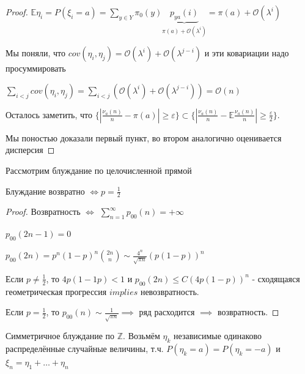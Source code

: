 \begin{proof}
    $\mathbb{E} \eta_i = P(\xi_i = a) = \sum\limits_{y \in Y} \pi_0 (y) \underbrace{p_{ya} (i)}_{\pi (a) + \mathcal{O} (\lambda^i)} = \pi (a) + \mathcal{O} (\lambda^i)$ 

    Мы поняли, что $cov (\eta_i, \eta_j) = \mathcal{O} (\lambda^i) + \mathcal{O} (\lambda^{j - i})$ и эти ковариации надо просуммировать

    $\sum\limits_{i < j} cov (\eta_i, \eta_j) = \sum\limits_{i < j} \left(\mathcal{O} (\lambda^i) + \mathcal{O} (\lambda^{j - i})\right) = \mathcal{O} (n)$

    Осталось заметить, что $\{ \left| \frac{\nu_a (n)}{n} - \pi (a) \right| \geqslant \varepsilon \} \subset \{ \left| \frac{\nu_a (n)}{n} - \mathbb{E} \frac{\nu_a (n)}{n} \right| \geqslant \frac{\varepsilon}{2} \}$.

    Мы поностью доказали первый пункт, во втором аналогично оценивается дисперсия
\end{proof}


\begin{theorem}
    Рассмотрим блуждание по целочисленной прямой

    Блуждание возвратно $\Longleftrightarrow p = \frac{1}{2}$
\end{theorem}

\begin{proof}
    Возвратность $\Longleftrightarrow$ $\sum\limits_{n=1}^\infty p_{00} (n) = +\infty$

    $p_{00} (2n - 1) = 0$

    $p_{00} (2n) = p^n (1-p)^n \binom{2n}{n} \sim \frac{4^n}{\sqrt{\pi n}} (p(1-p))^n $

    Если $p \neq \frac{1}{2}$, то $4p (1 - 1p) < 1$ и $p_{00} (2n) \leqslant C (4p(1-p))^n $ - сходящаяся геометрическая прогрессия $implies$ невозвратность.

    Если $p = \frac{1}{2}$, то $p_{00} (n) \sim \frac{1}{\sqrt{\pi n}} \implies$ ряд расходится $\implies$ возвратность.
\end{proof}

\begin{remark}
    
Симметричное блуждание по $\mathbb{Z}$. Возьмём $\eta_k$ независимые одинаково распределённые случайные величины, т.ч. $P(\eta_k = a) = P(\eta_k = -a)$ и $\xi_n = \eta_1 + \ldots + \eta_n$

\end{remark}

